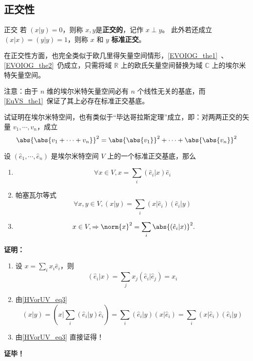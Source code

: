\subsection{正交性}
\begin{definition}{正交}
若 $(  x|  y)=0$，则称 $  x,  y$是\textbf{正交的}，记作 $  x\perp  y$。
此外若还成立 $(  x|  x)=(  y|  y)=1$，则称 $  x$ 和 $  y$ \textbf{标准正交}。
\end{definition}
在正交性方面，也完全类似于欧几里得矢量空间情形，\autoref{EVOIOG_the1}~、\autoref{EVOIOG_the2}~仍成立，只需将域 $\mathbb{R}$ 上的欧氏矢量空间替换为域 $\mathbb{C}$ 上的埃尔米特矢量空间。

注意：由于 $n$ 维的埃尔米特矢量空间必有 $n$ 个线性无关的基底，而\autoref{EuVS_the1}~保证了其上必存在标准正交基底。
\begin{example}{}
试证明在埃尔米特空间，也有类似于“毕达哥拉斯定理”成立，即：对两两正交的矢量 $  v_1,\cdots,  v_n$，成立
\begin{equation}
\abs{\abs{  v_1+\cdots+  v_n}}^2=\abs{\abs{  v_1}}^2+\cdots+\abs{\abs{  v_n}}^2
\end{equation}
\end{example}

\begin{theorem}{}
设 $(\hat e_1,\cdots, \hat e_n)$ 是埃尔米特空间 $V$ 上的一个标准正交基底，那么
\begin{enumerate}
\item \begin{equation}\label{HVorUV_eq3}
\forall  x\in V,  x=\sum_{i}( \hat e_i|  x)\hat e_i
\end{equation}
\item 帕塞瓦尔等式
\begin{equation}
\forall  x,  y\in V,(  x|  y)=\sum_{i}(  x|\hat e_i)(  \hat e_i|  y)
\end{equation}
\item \begin{equation}
\  x\in V,\Rightarrow\norm{  x}^2=\sum_{i}\abs{(  \hat e_i|  x)}^2.
\end{equation}
\end{enumerate}
\end{theorem}
\textbf{证明：}\begin{enumerate}
\item 设 $  x=\sum_{i}x_i 
 \hat e_i$，则
\begin{equation}
( \hat e_i|  x)=\sum_{j}x_j( \hat e_i| \hat e_j)=x_i
\end{equation}
\item 由\autoref{HVorUV_eq3} 
\begin{equation}
(  x|  y)=(  x|\sum_{i}( \hat e_i|  y) \hat e_i)=\sum_{i}( \hat e_i|  y)(  x| \hat e_i)=\sum_{i}(  x| \hat e_i)( \hat e_i|  y)
\end{equation}
\item 由\autoref{HVorUV_eq3} 直接证得！
\end{enumerate}
\textbf{证毕！}
